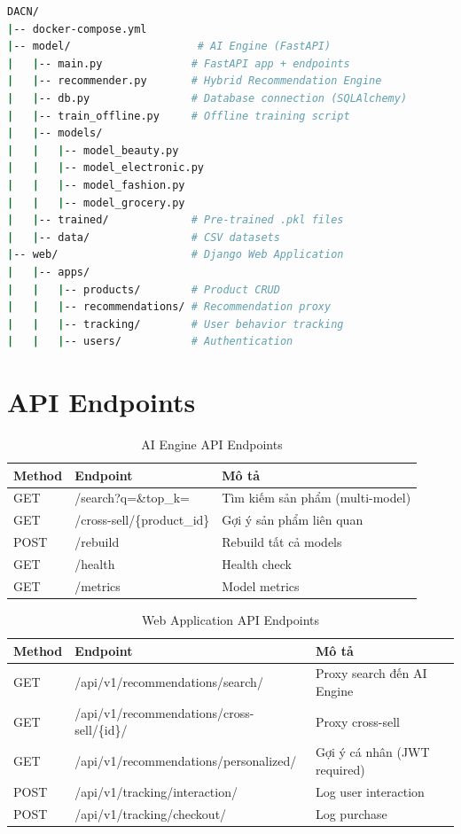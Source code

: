 \documentclass[12pt,a4paper]{report}
\begin{document}
\begin{lstlisting}[language=bash, caption=Cấu trúc project]
DACN/
|-- docker-compose.yml
|-- model/                    # AI Engine (FastAPI)
|   |-- main.py              # FastAPI app + endpoints
|   |-- recommender.py       # Hybrid Recommendation Engine
|   |-- db.py                # Database connection (SQLAlchemy)
|   |-- train_offline.py     # Offline training script
|   |-- models/
|   |   |-- model_beauty.py
|   |   |-- model_electronic.py
|   |   |-- model_fashion.py
|   |   |-- model_grocery.py
|   |-- trained/             # Pre-trained .pkl files
|   |-- data/                # CSV datasets
|-- web/                     # Django Web Application
|   |-- apps/
|   |   |-- products/        # Product CRUD
|   |   |-- recommendations/ # Recommendation proxy
|   |   |-- tracking/        # User behavior tracking
|   |   |-- users/           # Authentication
\end{lstlisting}

\section{API Endpoints}

\begin{table}[H]
\centering
\caption{AI Engine API Endpoints}
\label{tab:api_endpoints}
\begin{tabular}{llp{6cm}}
\toprule
\textbf{Method} & \textbf{Endpoint} & \textbf{Mô tả} \\
\midrule
GET & /search?q=\&top\_k= & Tìm kiếm sản phẩm (multi-model) \\
GET & /cross-sell/\{product\_id\} & Gợi ý sản phẩm liên quan \\
POST & /rebuild & Rebuild tất cả models \\
GET & /health & Health check \\
GET & /metrics & Model metrics \\
\bottomrule
\end{tabular}
\end{table}

\begin{table}[H]
\centering
\caption{Web Application API Endpoints}
\label{tab:web_api}
\begin{tabular}{llp{6cm}}
\toprule
\textbf{Method} & \textbf{Endpoint} & \textbf{Mô tả} \\
\midrule
GET & /api/v1/recommendations/search/ & Proxy search đến AI Engine \\
GET & /api/v1/recommendations/cross-sell/\{id\}/ & Proxy cross-sell \\
GET & /api/v1/recommendations/personalized/ & Gợi ý cá nhân (JWT required) \\
POST & /api/v1/tracking/interaction/ & Log user interaction \\
POST & /api/v1/tracking/checkout/ & Log purchase \\
\bottomrule
\end{tabular}
\end{table}
\end{document}
